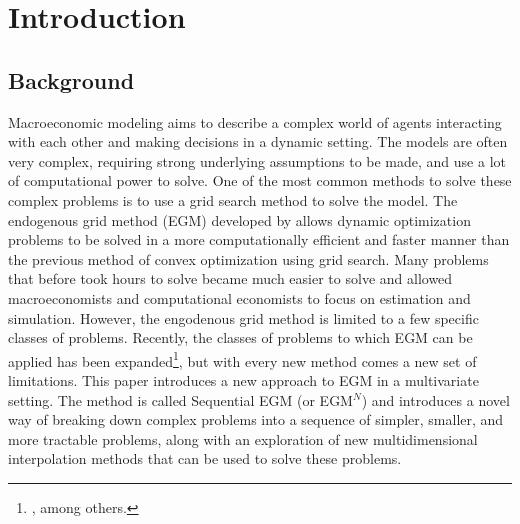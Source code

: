 \documentclass[\econtexRoot/EGMN]{subfiles}
\begin{document}
\hypertarget{introduction}{}\par\section{Introduction}\notinsubfile{\label{sec:intro}}
\setcounter{page}{0}

\subsection{Background} %



Macroeconomic modeling aims to describe a complex world of agents interacting with each other and making decisions in a dynamic setting. The models are often very complex, requiring strong underlying assumptions to be made, and use a lot of computational power to solve. One of the most common methods to solve these complex problems is to use a grid search method to solve the model. The endogenous grid method (EGM) developed by \cite{Carroll2006-wq} allows dynamic optimization problems to be solved in a more computationally efficient and faster manner than the previous method of convex optimization using grid search. Many problems that before took hours to solve became much easier to solve and allowed macroeconomists and computational economists to focus on estimation and simulation.
However, the engodenous grid method is limited to a few specific classes of problems. Recently, the classes of problems to which EGM can be applied has been expanded\footnote{\cite{Fella2014-my,Druedahl2017-vn,Iskhakov2017-my}, among others.}, but with every new method comes a new set of limitations.
This paper introduces a new approach to EGM in a multivariate setting. The method is called Sequential EGM (or EGM$^N$) and introduces a novel way of breaking down complex problems into a sequence of simpler, smaller, and more tractable problems, along with an exploration of new multidimensional interpolation methods that can be used to solve these problems.
\end{document}
